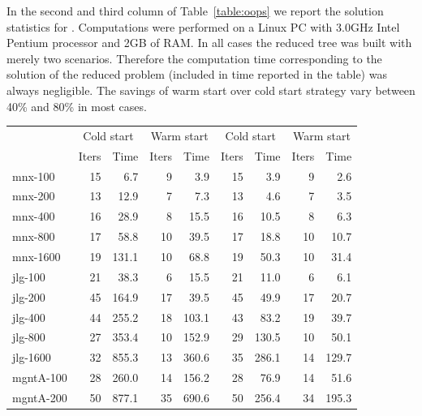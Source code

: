 In the second and third column of Table~\ref{table:oops} 
we report the solution statistics for \OOPS.
Computations were performed on a Linux PC with 3.0GHz Intel Pentium
processor and 2GB of RAM.
In all cases the reduced tree was built with merely two scenarios.
Therefore the computation time corresponding to the solution 
of the reduced problem (included in time reported in the table) 
was always negligible. The savings of warm start over cold start 
strategy vary between 40\% and 80\% in most cases.
%
\begin{table}[ht]
  \begin{center}
    \begin{tabular}{|l||rr|rr||rr|rr|} \hline
     \multicolumn{1}{|c||}{\raisebox{-1ex}{Problem}} &
     \multicolumn{2}{c|}{Cold start} &
     \multicolumn{2}{c||}{Warm start} &
     \multicolumn{2}{c|}{Cold start} &
     \multicolumn{2}{c|}{Warm start}\\
              &Iters &   Time &Iters &   Time & Iters &   Time & Iters &   Time  \\ \hline\hline
mnx-100       &   15 &    6.7 &    9 &    3.9 &  15 &    3.9 &   9 &    2.6 \\
mnx-200       &   13 &   12.9 &    7 &    7.3 &  13 &    4.6 &   7 &    3.5 \\
mnx-400       &   16 &   28.9 &    8 &   15.5 &  16 &   10.5 &   8 &    6.3 \\
mnx-800       &   17 &   58.8 &   10 &   39.5 &  17 &   18.8 &  10 &   10.7 \\
mnx-1600      &   19 &  131.1 &   10 &   68.8 &  19 &   50.3 &  10 &   31.4 \\
\hline
jlg-100       &   21 &   38.3 &    6 &   15.5 &  21 &   11.0 &   6 &    6.1 \\
jlg-200       &   45 &  164.9 &   17 &   39.5 &  45 &   49.9 &  17 &   20.7 \\
jlg-400       &   44 &  255.2 &   18 &  103.1 &  43 &   83.2 &  19 &   39.7 \\ %
jlg-800       &   27 &  353.4 &   10 &  152.9 &  29 &  130.5 &  10 &   50.1 \\ %
jlg-1600      &   32 &  855.3 &   13 &  360.6 &  35 &  286.1 &  14 &  129.7 \\ %
\hline
mgntA-100     &   28 &  260.0 &   14 &  156.2 &  28 &   76.9 &  14 &   51.6 \\
mgntA-200     &   50 &  877.1 &   35 &  690.6 &  50 &  256.4 &  34 &  195.3 \\

\end{tabular}
\end{center}
\end{table}
